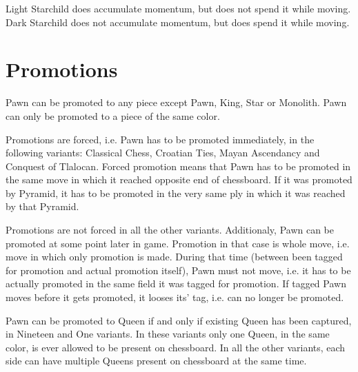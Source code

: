 Light Starchild does accumulate momentum, but does not spend it while moving.
Dark Starchild does not accumulate momentum, but does spend it while moving.

\section*{Promotions}
\label{sec:Definitions/Promotions}

Pawn can be promoted to any piece except Pawn, King, Star or Monolith.
Pawn can only be promoted to a piece of the same color.

Promotions are forced, i.e. Pawn has to be promoted immediately, in the following
variants: Classical Chess, Croatian Ties, Mayan Ascendancy and Conquest of Tlalocan.
Forced promotion means that Pawn has to be promoted in the same move in which it
reached opposite end of chessboard. If it was promoted by Pyramid, it has to be
promoted in the very same ply in which it was reached by that Pyramid.

Promotions are not forced in all the other variants. Additionaly, Pawn can be promoted
at some point later in game. Promotion in that case is whole move, i.e. move in which
only promotion is made. During that time (between been tagged for promotion and actual
promotion itself), Pawn must not move, i.e. it has to be actually promoted in the same
field it was tagged for promotion. If tagged Pawn moves before it gets promoted, it
looses its' tag, i.e. can no longer be promoted.

Pawn can be promoted to Queen if and only if existing Queen has been captured, in
Nineteen and One variants. In these variants only one Queen, in the same color, is
ever allowed to be present on chessboard. In all the other variants, each side can
have multiple Queens present on chessboard at the same time.




